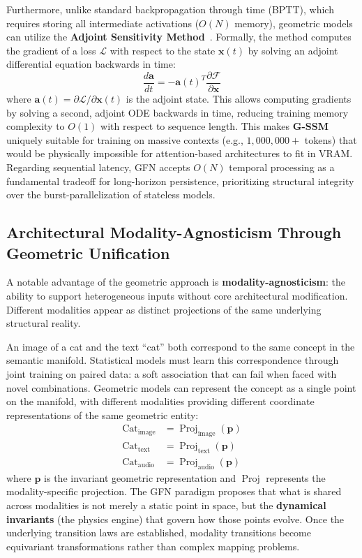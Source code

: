 \documentclass[12pt,a4paper]{article}
\DeclareMathOperator{\Proj}{Proj}
\begin{document}
Furthermore, unlike standard backpropagation through time (BPTT), which requires storing all intermediate activations ($O(N)$ memory), geometric models can utilize the \textbf{Adjoint Sensitivity Method}~\cite{chen2018, pontryagin1962}. Formally, the method computes the gradient of a loss $\mathcal{L}$ with respect to the state $\mathbf{x}(t)$ by solving an adjoint differential equation backwards in time:
\begin{equation}
    \frac{d\mathbf{a}}{dt} = -\mathbf{a}(t)^T \frac{\partial \mathcal{F}}{\partial \mathbf{x}}
    \label{eq:adjoint}
\end{equation}
where $\mathbf{a}(t) = \partial \mathcal{L} / \partial \mathbf{x}(t)$ is the adjoint state. This allows computing gradients by solving a second, adjoint ODE backwards in time, reducing training memory complexity to $O(1)$ with respect to sequence length. This makes \textbf{G-SSM} uniquely suitable for training on massive contexts (e.g., $1,000,000+$ tokens) that would be physically impossible for attention-based architectures to fit in VRAM. Regarding sequential latency, GFN accepts $O(N)$ temporal processing as a fundamental tradeoff for long-horizon persistence, prioritizing structural integrity over the burst-parallelization of stateless models.

\subsection{Architectural Modality-Agnosticism Through Geometric Unification}
\label{sec:multimodality}

A notable advantage of the geometric approach is \textbf{modality-agnosticism}: the ability to support heterogeneous inputs without core architectural modification. Different modalities appear as distinct projections of the same underlying structural reality.

An image of a cat and the text ``cat'' both correspond to the same concept in the semantic manifold. Statistical models must learn this correspondence through joint training on paired data: a soft association that can fail when faced with novel combinations. Geometric models can represent the concept as a single point on the manifold, with different modalities providing different coordinate representations of the same geometric entity:
\begin{align}
    \text{Cat}_{\text{image}} &= \Proj_{\text{image}}(\mathbf{p}) \\
    \text{Cat}_{\text{text}} &= \Proj_{\text{text}}(\mathbf{p}) \\
    \text{Cat}_{\text{audio}} &= \Proj_{\text{audio}}(\mathbf{p})
\end{align}
where $\mathbf{p}$ is the invariant geometric representation and $\Proj$ represents the modality-specific projection. The GFN paradigm proposes that what is shared across modalities is not merely a static point in space, but the \textbf{dynamical invariants} (the physics engine) that govern how those points evolve. Once the underlying transition laws are established, modality transitions become equivariant transformations rather than complex mapping problems.
\end{document}
